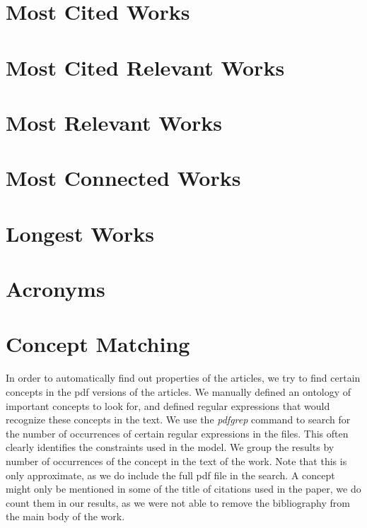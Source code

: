 \documentclass[a4paper]{article}
\begin{document}


\clearpage
\section{Most Cited Works}



\clearpage
\section{Most Cited Relevant Works}



\clearpage
\section{Most Relevant Works}



\clearpage
\section{Most Connected Works}



\clearpage
\section{Longest Works}




\clearpage
\section{Acronyms}





\clearpage
\section{Concept Matching}

In order to automatically find out properties of the articles, we try to find certain concepts in the pdf versions of the articles. We manually defined an ontology of important concepts to look for, and defined regular expressions that would recognize these concepts in the text. We use the \emph{pdfgrep} command to search for the number of occurrences of certain regular expressions in the files. This often clearly identifies the constraints used in the model. We group the results by number of occurrences of the concept in the text of the work. Note that this is only approximate, as we do include the full pdf file in the search. A concept might only be mentioned in some of the title of citations used in the paper, we do count them in our results, as we were not able to remove the bibliography from the main body of the work.
\end{document}
